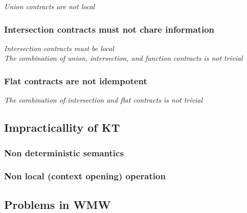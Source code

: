 \textit{Union contracts are not local}

\subsubsection*{Intersection contracts must not chare information}

\textit{Intersection contracts must be local}\\

\textit{The combination of union, intersection, and function contracts is not trivial}

\subsubsection*{Flat contracts are not idempotent}

\textit{The combination of intersection and flat contracts is not trivial}


\subsection{Impracticallity of KT}

\subsubsection{Non deterministic semantics}

\subsubsection{Non local (context opening) operation}

\subsection{Problems in WMW}
